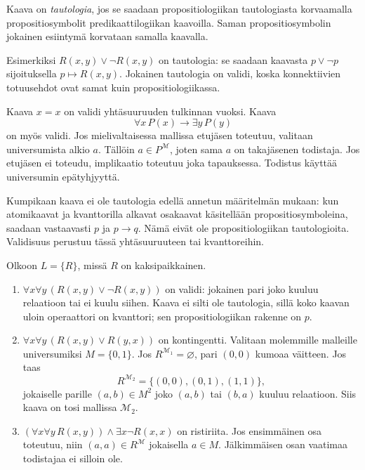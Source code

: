 \documentclass[11pt,a4paper]{amsart}
\begin{document}
\begin{definition}
  Kaava on \emph{tautologia}, jos se saadaan propositiologiikan
  tautologiasta korvaamalla propositiosymbolit predikaattilogiikan
  kaavoilla. Saman propositiosymbolin jokainen esiintymä korvataan
  samalla kaavalla.
\end{definition}

Esimerkiksi $R(x,y)\lor\neg R(x,y)$ on tautologia: se saadaan
kaavasta $p\lor\neg p$ sijoituksella $p\mapsto R(x,y)$.
Jokainen tautologia on validi, koska konnektiivien totuusehdot
ovat samat kuin propositiologiikassa.

\begin{example}
  Kaava $x=x$ on validi yhtäsuuruuden tulkinnan vuoksi. Kaava
  \[
    \forall x\,P(x)\to\exists y\,P(y)
  \]
  on myös validi. Jos mielivaltaisessa mallissa etujäsen toteutuu,
  valitaan universumista alkio $a$. Tällöin $a\in P^{\mathcal M}$,
  joten sama $a$ on takajäsenen todistaja. Jos etujäsen ei toteudu,
  implikaatio toteutuu joka tapauksessa. Todistus käyttää universumin
  epätyhjyyttä.

  Kumpikaan kaava ei ole tautologia edellä annetun määritelmän mukaan:
  kun atomikaavat ja kvanttorilla alkavat osakaavat käsitellään
  propositiosymboleina, saadaan vastaavasti $p$ ja $p\to q$.
  Nämä eivät ole propositiologiikan tautologioita. Validisuus perustuu
  tässä yhtäsuuruuteen tai kvanttoreihin.
\end{example}

\begin{example}
  Olkoon $L=\{R\}$, missä $R$ on kaksipaikkainen.
  \begin{enumerate}
    \item $\forall x\forall y\,(R(x,y)\lor\neg R(x,y))$ on validi:
      jokainen pari joko kuuluu relaatioon tai ei kuulu siihen.
      Kaava ei silti ole tautologia, sillä koko kaavan uloin
      operaattori on kvanttori; sen propositiologiikan rakenne on $p$.
    \item $\forall x\forall y\,(R(x,y)\lor R(y,x))$ on kontingentti.
      Valitaan molemmille malleille universumiksi $M=\{0,1\}$.
      Jos $R^{\mathcal M_1}=\varnothing$, pari $(0,0)$ kumoaa väitteen.
      Jos taas
      \[
        R^{\mathcal M_2}=\{(0,0),(0,1),(1,1)\},
      \]
      jokaiselle parille $(a,b)\in M^2$ joko $(a,b)$ tai $(b,a)$
      kuuluu relaatioon. Siis kaava on tosi mallissa $\mathcal M_2$.
    \item $(\forall x\forall y\,R(x,y))\land\exists x\neg R(x,x)$
      on ristiriita. Jos ensimmäinen osa toteutuu, niin
      $(a,a)\in R^{\mathcal M}$ jokaisella $a\in M$.
      Jälkimmäisen osan vaatimaa todistajaa ei silloin ole.
  \end{enumerate}
\end{example}
\end{document}
